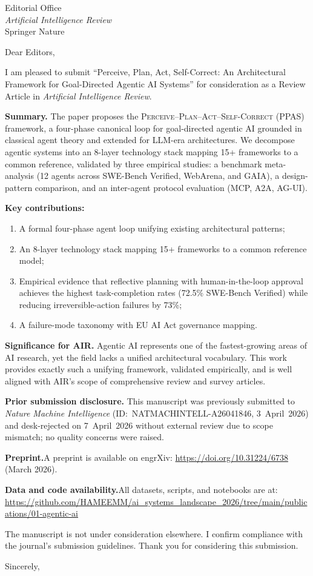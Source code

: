 \documentclass[10pt]{letter}
\date{April 8, 2026}
\begin{document}
\begin{letter}{Editorial Office\\
\emph{Artificial Intelligence Review}\\
Springer Nature}

\opening{Dear Editors,}

I am pleased to submit ``Perceive, Plan, Act, Self-Correct: An Architectural Framework for Goal-Directed Agentic AI Systems'' for consideration as a Review Article in \emph{Artificial Intelligence Review}.

\textbf{Summary.}\quad
The paper proposes the \textsc{Perceive--Plan--Act--Self-Correct} (PPAS) framework, a four-phase canonical loop for goal-directed agentic AI grounded in classical agent theory and extended for LLM-era architectures. We decompose agentic systems into an 8-layer technology stack mapping 15+ frameworks to a common reference, validated by three empirical studies: a benchmark meta-analysis (12 agents across SWE-Bench Verified, WebArena, and GAIA), a design-pattern comparison, and an inter-agent protocol evaluation (MCP, A2A, AG-UI).

\textbf{Key contributions:}
\begin{enumerate}[nosep, leftmargin=1.5em]
    \item A formal four-phase agent loop unifying existing architectural patterns;
    \item An 8-layer technology stack mapping 15+ frameworks to a common reference model;
    \item Empirical evidence that reflective planning with human-in-the-loop approval achieves the highest task-completion rates (72.5\% SWE-Bench Verified) while reducing irreversible-action failures by 73\%;
    \item A failure-mode taxonomy with EU AI Act governance mapping.
\end{enumerate}

\textbf{Significance for AIR.}\quad
Agentic AI represents one of the fastest-growing areas of AI research, yet the field lacks a unified architectural vocabulary. This work provides exactly such a unifying framework, validated empirically, and is well aligned with AIR's scope of comprehensive review and survey articles.

\textbf{Prior submission disclosure.}\quad
This manuscript was previously submitted to \emph{Nature Machine Intelligence} (ID:~NATMACHINTELL-A26041846, 3~April~2026) and desk-rejected on 7~April~2026 without external review due to scope mismatch; no quality concerns were raised.

\textbf{Preprint.}\quad A preprint is available on engrXiv: \url{https://doi.org/10.31224/6738} (March 2026).

\textbf{Data and code availability.}\quad All datasets, scripts, and notebooks are at: \url{https://github.com/HAMEEMM/ai_systems_landscape_2026/tree/main/publications/01-agentic-ai}

The manuscript is not under consideration elsewhere. I confirm compliance with the journal's submission guidelines. Thank you for considering this submission.

\closing{Sincerely,}

\end{letter}
\end{document}
